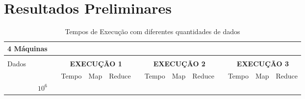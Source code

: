 \chapter{Resultados Preliminares}
\label{cap:resultados}

\begin{table}[htbp]
\caption{Tempos de Execução com diferentes quantidades de dados}
\begin{center}
\begin{tabular}{|r|l|l|l|l|l|l|l|l|l|l|l|l|}
\hline
\multicolumn{1}{|l|}{4 Máquinas} & \textbf{} &  & \multicolumn{1}{r|}{\textbf{}} &  &  & \multicolumn{1}{r|}{\textbf{}} &  & \multicolumn{1}{r|}{\textbf{}} & \multicolumn{1}{r|}{\textbf{}} &  & \multicolumn{1}{r|}{\textbf{}} &  \\ \hline
\multicolumn{1}{|l|}{\textbf{}} & \textbf{} & \multicolumn{1}{r|}{\textbf{}} & \multicolumn{1}{r|}{\textbf{}} & \multicolumn{1}{r|}{\textbf{}} & \multicolumn{1}{r|}{\textbf{}} & \multicolumn{1}{r|}{\textbf{}} & \multicolumn{1}{r|}{\textbf{}} & \multicolumn{1}{r|}{\textbf{}} & \multicolumn{1}{r|}{\textbf{}} & \multicolumn{1}{r|}{\textbf{}} & \multicolumn{1}{r|}{\textbf{}} & \multicolumn{1}{r|}{\textbf{}} \\ \hline
\multicolumn{1}{|l|}{Dados} & \textbf{} & \multicolumn{ 3}{c|}{\textbf{EXECUÇÃO 1}} & \multicolumn{1}{r|}{\textbf{}} & \multicolumn{ 3}{c|}{\textbf{EXECUÇÃO 2}} & \multicolumn{1}{r|}{\textbf{}} & \multicolumn{ 3}{c|}{\textbf{EXECUÇÃO 3}} \\ \hline
\multicolumn{1}{|l|}{} &  & Tempo & Map & Reduce &  & Tempo & Map & Reduce &  & Tempo & Map & Reduce \\ \hline
\textbf{$10^{6}$} &  &  &  &  &  &  &  &  &  &  &  &  \\ \hline
\end{tabular}
\end{center}
\label{Teste}
\end{table}
